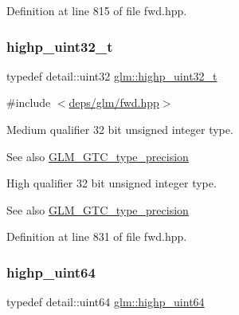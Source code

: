 Definition at line 815 of file fwd.\+hpp.

\mbox{\label{group__gtc__type__precision_ga8eb85ad460079c63b68866ae34637bda}} 
\subsubsection{\texorpdfstring{highp\+\_\+uint32\+\_\+t}{highp\_uint32\_t}}
{\footnotesize\ttfamily typedef detail\+::uint32 \hyperlink{group__gtc__type__precision_ga8eb85ad460079c63b68866ae34637bda}{glm\+::highp\+\_\+uint32\+\_\+t}}



{\ttfamily \#include $<$\hyperlink{fwd_8hpp}{deps/glm/fwd.\+hpp}$>$}

Medium qualifier 32 bit unsigned integer type. \begin{DoxySeeAlso}{See also}
\hyperlink{group__gtc__type__precision}{G\+L\+M\+\_\+\+G\+T\+C\+\_\+type\+\_\+precision}
\end{DoxySeeAlso}
High qualifier 32 bit unsigned integer type. \begin{DoxySeeAlso}{See also}
\hyperlink{group__gtc__type__precision}{G\+L\+M\+\_\+\+G\+T\+C\+\_\+type\+\_\+precision} 
\end{DoxySeeAlso}


Definition at line 831 of file fwd.\+hpp.

\mbox{\label{group__gtc__type__precision_ga8079c653e20cda03d34b99de629a7b09}} 
\subsubsection{\texorpdfstring{highp\+\_\+uint64}{highp\_uint64}}
{\footnotesize\ttfamily typedef detail\+::uint64 \hyperlink{group__gtc__type__precision_ga8079c653e20cda03d34b99de629a7b09}{glm\+::highp\+\_\+uint64}}



